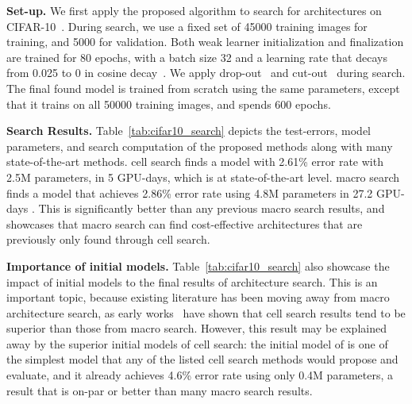 \textbf{Set-up.}
We first apply the proposed algorithm to search for architectures on CIFAR-10~\citep{cifar}. During search, we use a fixed set of 45000 training images for training, and 5000 for validation. Both weak learner initialization and finalization are trained for 80 epochs, with a batch size 32 and a learning rate that decays from 0.025 to 0 in cosine decay~\citep{cosine_lr}. We apply drop-out~\citep{larsson2016fractalnet} and cut-out~\citep{cutout} during search. The final found model is trained from scratch using the same parameters, except that it trains on all 50000 training images, and spends 600 epochs. 


\textbf{Search Results.} 
Table~\ref{tab:cifar10_search} depicts the test-errors, model parameters, and search computation of the proposed methods along with many state-of-the-art methods.
\Petridish cell search finds a model with 2.61\% error rate with 2.5M parameters, in 5 GPU-days, which is at  state-of-the-art level. \Petridish macro search finds a model that achieves 2.86\% error rate using 4.8M parameters in 27.2 GPU-days . This is significantly better than any previous macro search results, 
and showcases that macro search can find cost-effective architectures that are previously only found through cell search. 

\textbf{Importance of initial models.}
Table~\ref{tab:cifar10_search} also showcase the impact of initial models to the final results of architecture search. This is an important topic, because existing literature has been moving away from macro architecture search, as early works~\citep{NASCell,Pham2018EfficientNA,Real2018RegularizedEF} have shown that cell search results tend to be superior than those from macro search. However, this result may be explained away by the superior initial models of cell search: the initial model of \Petridish is one of the simplest model that any of the listed cell search methods would propose and evaluate, and it already achieves 4.6\% error rate using only 0.4M parameters, a result that is on-par or better than many macro search results. 


